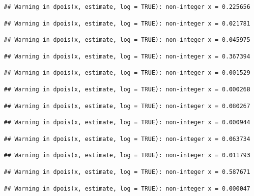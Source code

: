 \documentclass[]{article}
\begin{document}
\begin{verbatim}
## Warning in dpois(x, estimate, log = TRUE): non-integer x = 0.225656
\end{verbatim}

\begin{verbatim}
## Warning in dpois(x, estimate, log = TRUE): non-integer x = 0.021781
\end{verbatim}

\begin{verbatim}
## Warning in dpois(x, estimate, log = TRUE): non-integer x = 0.045975
\end{verbatim}

\begin{verbatim}
## Warning in dpois(x, estimate, log = TRUE): non-integer x = 0.367394
\end{verbatim}

\begin{verbatim}
## Warning in dpois(x, estimate, log = TRUE): non-integer x = 0.001529
\end{verbatim}

\begin{verbatim}
## Warning in dpois(x, estimate, log = TRUE): non-integer x = 0.000268
\end{verbatim}

\begin{verbatim}
## Warning in dpois(x, estimate, log = TRUE): non-integer x = 0.080267
\end{verbatim}

\begin{verbatim}
## Warning in dpois(x, estimate, log = TRUE): non-integer x = 0.000944
\end{verbatim}

\begin{verbatim}
## Warning in dpois(x, estimate, log = TRUE): non-integer x = 0.063734
\end{verbatim}

\begin{verbatim}
## Warning in dpois(x, estimate, log = TRUE): non-integer x = 0.011793
\end{verbatim}

\begin{verbatim}
## Warning in dpois(x, estimate, log = TRUE): non-integer x = 0.587671
\end{verbatim}

\begin{verbatim}
## Warning in dpois(x, estimate, log = TRUE): non-integer x = 0.000047
\end{verbatim}
\end{document}
